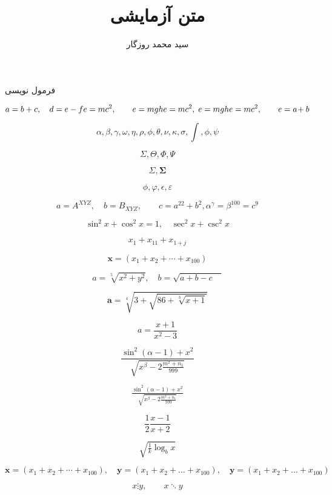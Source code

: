 \documentclass[12pt]{article}
\title{متن آزمایشی}
\author{سید محمد روزگار}
\begin{document}
\maketitle

فرمول نویسی

\[
a = b + c,\quad d=e-f\\
e = mc^2 ,\qquad e = mgh
e = mc^2 ,\; e = mgh
e = mc^2 ,\qquad e = a\!+ b 
\]

\[
\alpha,\beta,\gamma,\omega,\eta,\rho,\phi,\theta,\nu,\kappa,\sigma,\int,\phi,\psi
\]

\[
\Sigma,\Theta,\Phi,\Psi
\]

\[
\Sigma,\boldsymbol{\Sigma}
\]

\[
\phi,\varphi,\epsilon,\varepsilon
\]

\[
a = A^{XYZ},\quad b= B_{XYZ},\qquad c = a^{22}+b^{2},\alpha^{\gamma} = \beta^{100} = c^9
\]

\[
\sin^2x + \cos^2x=1,\quad \sec^2x+\csc^2x
\]

\[
x_1 + x_{11} + x_{1+j}
\]


\[
\mathbf{x} = (x_1+x_2+\cdots+x_{100})
\]

\[
a = \sqrt[5]{x^2+y^2},\quad b = \sqrt{a+b-c\quad}
\]

\[
\mathbf{a} = \sqrt[4]{3+\sqrt{86+\sqrt[3]{x+1}}}
\]

\[
a = \frac{x+1}{x^2-3}
\]

\[
\frac{\sin^2(\alpha - 1)+x^2}{\sqrt{x^\beta-2\frac{m^2+n_1}{999}}}
\]

\[
\tfrac{\sin^2(\alpha - 1)+x^2}{\sqrt{x^\beta-2\tfrac{m^2+n_1}{999}}}
\]

\[
\frac12 \frac{x-1}{x+2}
\]

\[
\sqrt{\tfrac{1}{k}\log_bx}
\]

\[
\mathbf{x} = (x_1+x_2+\cdots+x_{100}),\quad \mathbf{y} = (x_1+x_2+\dots+x_{100}),\quad \mathbf{y} = (x_1+x_2+\ldots+x_{100})
\]

\[
x \vdots y,\qquad x \ddots y
\]
\end{document}
